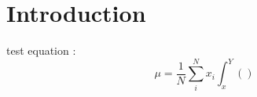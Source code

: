 \documentclass[main.tex]{subfiles}
\begin{document}
\chapter*{Introduction}

\noindent test equation : 
\begin{equation}
\mu = \frac{1}{N} \sum_i^N x_i \int _x^Y \left( \right)
\end{equation}
\end{document}
